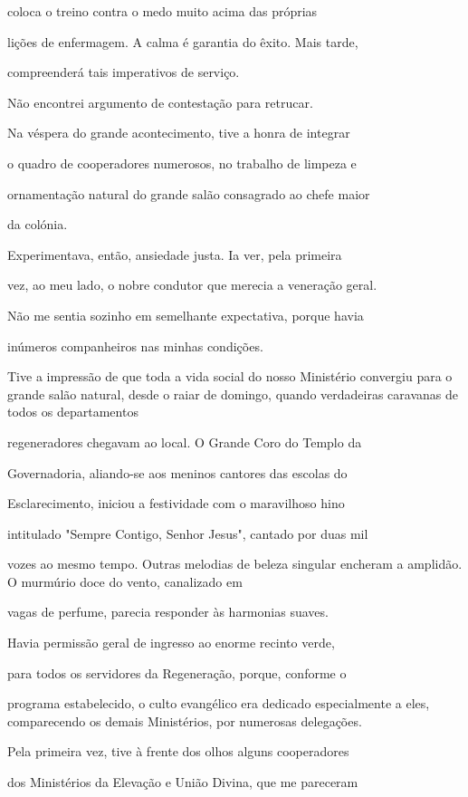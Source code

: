 \documentclass[portuguese,12pt,a4paper]{scrbook}
\begin{document}
	coloca o treino contra o medo muito acima das próprias
	
	lições de enfermagem. A calma é garantia do êxito. Mais tarde,
	
	compreenderá tais imperativos de serviço.
	
	Não encontrei argumento de contestação para retrucar.
	
	Na véspera do grande acontecimento, tive a honra de integrar
	
	o quadro de cooperadores numerosos, no trabalho de limpeza e
	
	ornamentação natural do grande salão consagrado ao chefe maior
	
	da colónia.
	
	
	Experimentava, então, ansiedade justa. Ia ver, pela primeira
	
	vez, ao meu lado, o nobre condutor que merecia a veneração geral.
	
	Não me sentia sozinho em semelhante expectativa, porque havia
	
	inúmeros companheiros nas minhas condições.
	
	Tive a impressão de que toda a vida social do nosso Ministério convergiu para o grande salão natural, desde o raiar de domingo, quando verdadeiras caravanas de todos os departamentos
	
	regeneradores chegavam ao local. O Grande Coro do Templo da
	
	Governadoria, aliando-se aos meninos cantores das escolas do
	
	Esclarecimento, iniciou a festividade com o maravilhoso hino
	
	intitulado "Sempre Contigo, Senhor Jesus", cantado por duas mil
	
	vozes ao mesmo tempo. Outras melodias de beleza singular encheram a amplidão. O murmúrio doce do vento, canalizado em
	
	vagas de perfume, parecia responder às harmonias suaves.
	
	Havia permissão geral de ingresso ao enorme recinto verde,
	
	para todos os servidores da Regeneração, porque, conforme o
	
	programa estabelecido, o culto evangélico era dedicado especialmente a eles, comparecendo os demais Ministérios, por numerosas delegações.
	
	Pela primeira vez, tive à frente dos olhos alguns cooperadores
	
	dos Ministérios da Elevação e União Divina, que me pareceram
	
\end{document}
